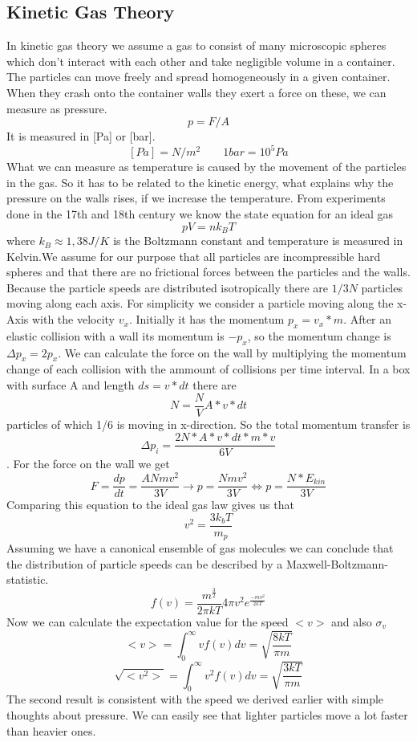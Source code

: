 \documentclass[]{article}
\begin{document}
\subsection{Kinetic Gas Theory}
In kinetic gas theory we assume a gas to consist of many microscopic spheres which don't interact with each other and take negligible volume in a container. The particles can move freely and spread homogeneously in a given container. When they crash onto the container walls they exert a force on these, we can measure as pressure. 
\[ p=F/A \]
It is measured in [Pa] or [bar].
\[ [Pa]=N/m^{2}     \qquad  1bar=10^{5}Pa		 \]
What we can measure as temperature is caused by the movement of the particles in the gas. So it has to be related to the kinetic energy, what explains why the pressure on the walls rises, if we increase the temperature. From experiments done in the 17th and 18th century we know the state equation for an ideal gas
\[ pV=nk_{B} T\]
 where $k_{B}\approx1,38J/K$ is the Boltzmann constant and temperature is measured in Kelvin.We assume for our purpose that all particles are incompressible hard spheres and that there are no frictional forces between the particles and the walls. Because the particle speeds are distributed isotropically there are $1/3N$ particles moving along each axis. For simplicity we consider a particle moving along the x-Axis with the velocity $v_{x}$. Initially it has the momentum $p_{x}=v_{x}*m$. After an elastic collision with a wall its momentum is $-p_{x}$, so the momentum change is $\Delta p_{x}=2p_{x}$. We can calculate the force on the wall by multiplying the momentum change of each collision with the ammount of collisions per time interval. In a box with surface A and length $ds=v*dt$ there are \[ N=\frac{N}{V}A *v* dt \] particles of which 1/6 is moving in x-direction. So the total momentum transfer is \[ \Delta p_{i}=\frac{2N* A* v* dt*m* v}{6V} \]. For the force on the wall we get \[ F=\frac{dp}{dt}=\frac{ANmv^{2}}{3V} \rightarrow p=\frac{Nmv^{2}}{3V} \Leftrightarrow p=\frac{N*E_{kin}}{3V}\] Comparing this equation to the ideal gas law gives us that \[ v^{2}=\frac{3k_{b}T}{m_{p}} \] 
 Assuming we have a canonical ensemble of gas molecules we can conclude that the distribution of particle speeds can be described by a Maxwell-Boltzmann-statistic. \[ f(v)=\frac{m^{\frac{3}{2}}}{2\pi k T} 4\pi v^{2} e^{\frac{-mv^{2}}{2kT}} \] Now we can calculate the expectation value for the speed $<v>$ and also $\sigma_{v}$
 \[<v>=\int_{0}^{\infty}vf(v)dv=\sqrt{\frac{8kT}{\pi m}}  \]
 \[ \sqrt{<v^{2}>}=\int_{0}^{\infty}v^{2}f(v)dv=\sqrt{\frac{3kT}{\pi m}}  \]
 The second result is consistent with the speed we derived earlier with simple thoughts about pressure. We can easily see that lighter particles move a lot faster than heavier ones. 
\end{document}
